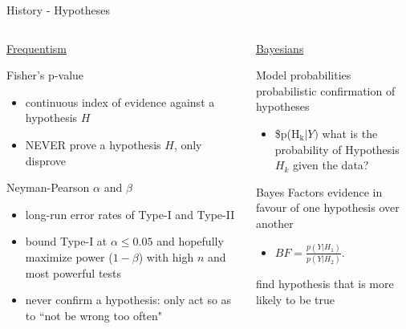 \documentclass[presentation,9pt,xcolor=dvipsnames]{beamer}
\begin{document}
\begin{frame}[label={sec:org3055e9b}]{History - Hypotheses}
\begin{columns}
\begin{column}{0.55\columnwidth}
\begin{block}{\uline{Frequentism}}
\begin{block}{Fisher's p-value}
\begin{itemize}
\item continuous index of evidence \alert{against} a hypothesis \(H\)
\item \alert{NEVER} prove a hypothesis \(H\), only disprove
\end{itemize}
\end{block}
\begin{block}{Neyman-Pearson \(\alpha\) and \(\beta\)}
\begin{itemize}
\item long-run error rates of Type-I and Type-II
\item \alert{bound} Type-I at \(\alpha\leq0.05\) and hopefully maximize power (\(1-\beta\)) with high \(n\) and most powerful tests
\item never confirm a hypothesis: only \alert{act} so as to ``not be wrong too often"
\end{itemize}
\end{block}
\end{block}
\end{column}
\begin{column}{0.45\columnwidth}
\begin{block}{\uline{Bayesians}}
\begin{block}{Model probabilities}
probabilistic confirmation of hypotheses
\begin{itemize}
\item \$p(H\(_{\text{k}} \vert Y)\) what is the probability of Hypothesis \(H_k\) given the data?
\end{itemize}
\end{block}
\begin{block}{Bayes Factors}
evidence in favour of one hypothesis over another
\begin{itemize}
\item \(BF=\frac{p(Y\vert H_1)}{p(Y\vert H_2)}\).
\end{itemize}
find hypothesis that is more likely to be true
\end{block}
\end{block}
\end{column}
\end{columns}
\end{frame}
\end{document}

